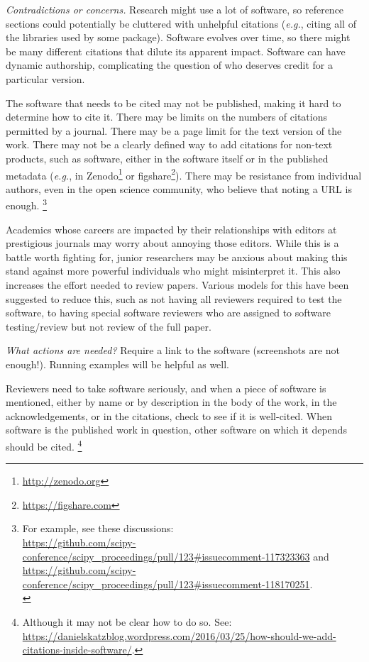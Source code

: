 \documentclass[a4paper,UKenglish]{dagman}
\newcommand{\eg}{\emph{e.g.},\xspace}
\begin{document}
\emph{Contradictions or concerns.}
Research might use a lot of software, so reference sections could potentially be cluttered with unhelpful citations (\eg citing all of the libraries used by some package). 
Software evolves over time, so there might be many different citations that dilute its apparent impact. 
Software can have dynamic authorship, complicating the question of who deserves credit for a particular version. 

The software that needs to be cited may not be published, making it hard to determine how to cite it.  There may be limits on the numbers of citations permitted by a journal.  There may be a page limit for the text version of the work.  There may not be a clearly defined way to add citations for non-text products, such as software, either in the software itself or in the published metadata (\eg in Zenodo\footnote{\url{http://zenodo.org}} or figshare\footnote{\url{https://figshare.com}}).
There may be resistance from individual authors, even in the open science community, who believe that noting a URL is enough.%
\footnote{For example, see these discussions:\\
\url{https://github.com/scipy-conference/scipy_proceedings/pull/123\#issuecomment-117323363} and\\
\url{https://github.com/scipy-conference/scipy_proceedings/pull/123\#issuecomment-118170251}.\\
}

Academics whose careers are impacted by their relationships with editors at prestigious journals may worry about annoying those editors. While this is a battle worth fighting for, junior researchers may be anxious about making this stand against more powerful individuals who might misinterpret it. 
This also increases the effort needed to review papers.  Various models for this have been suggested to reduce this, such as not having all reviewers required to test the software, to having special software reviewers who are assigned to software testing/review but not review of the full paper.

\emph{What actions are needed?}
Require a link to the software (screenshots are not enough!). Running examples will be helpful as well.

Reviewers need to take software seriously, and when a piece of software is mentioned, either by name or by description in the body of the work, in the acknowledgements, or in the citations, check to see if it is well-cited.  When software is the published work in question, other software on which it depends should be cited.%
\footnote{Although it may not be clear how to do so. See:\\ \url{https://danielskatzblog.wordpress.com/2016/03/25/how-should-we-add-citations-inside-software/}.}
\end{document}
